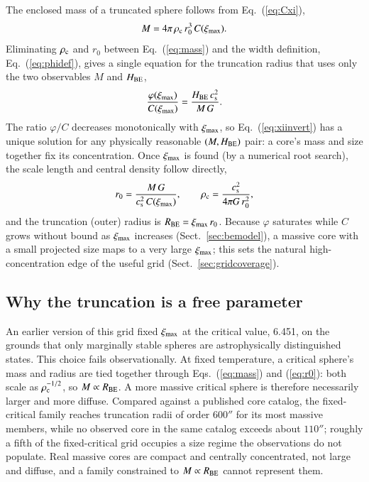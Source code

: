 \documentclass{aa}
\newcommand{\ximax}{\xi_{\rm max}}
\newcommand{\rhoc}{\rho_{\rm c}}
\newcommand{\cs}{c_{\rm s}}
\newcommand{\rzero}{r_{0}}
\newcommand{\Rbe}{R_{\rm BE}}
\begin{document}
The enclosed mass of a truncated sphere follows from Eq.~(\ref{eq:Cxi}),
\begin{equation}
  M = 4\pi\,\rhoc\,\rzero^{3}\,C(\ximax) .
  \label{eq:mass}
\end{equation}
Eliminating $\rhoc$ and $\rzero$ between Eq.~(\ref{eq:mass}) and the width
definition, Eq.~(\ref{eq:phidef}), gives a single equation for the
truncation radius that uses only the two observables $M$ and
$H_{\rm BE}$,
\begin{equation}
  \frac{\varphi(\ximax)}{C(\ximax)}
  = \frac{H_{\rm BE}\,\cs^{2}}{M\,G} .
  \label{eq:xiinvert}
\end{equation}
The ratio $\varphi/C$ decreases monotonically with $\ximax$, so
Eq.~(\ref{eq:xiinvert}) has a unique solution for any physically reasonable
$(M,H_{\rm BE})$ pair: a core's mass and size together
fix its concentration. Once $\ximax$ is found (by a numerical root search),
the scale length and central density follow directly,
\begin{equation}
  \rzero = \frac{M\,G}{\cs^{2}\,C(\ximax)},
  \qquad
  \rhoc = \frac{\cs^{2}}{4\pi G\,\rzero^{2}},
  \label{eq:rho_from_MFW}
\end{equation}
and the truncation (outer) radius is $\Rbe = \ximax\,\rzero$. Because
$\varphi$ saturates while $C$ grows without bound as $\ximax$ increases
(Sect.~\ref{sec:bemodel}), a massive core with a small projected size maps
to a very large $\ximax$; this sets the natural high-concentration edge of
the useful grid (Sect.~\ref{sec:gridcoverage}).

\subsection{Why the truncation is a free parameter}
\label{sec:geometry}

An earlier version of this grid fixed $\ximax$ at the critical value,
6.451, on the grounds that only marginally stable spheres are
astrophysically distinguished states. This choice fails observationally.
At fixed temperature, a critical sphere's mass and radius are tied
together through Eqs.~(\ref{eq:mass}) and (\ref{eq:r0}): both scale as
$\rhoc^{-1/2}$, so $M \propto \Rbe$. A more massive critical sphere is
therefore necessarily larger and more diffuse. Compared against a published
core catalog, the fixed-critical family reaches truncation radii of order
$600''$ for its most massive members, while no observed core in the same
catalog exceeds about $110''$; roughly a fifth of the fixed-critical grid
occupies a size regime the observations do not populate. Real massive
cores are compact and centrally concentrated, not large and diffuse, and a
family constrained to $M \propto \Rbe$ cannot represent them.
\end{document}
